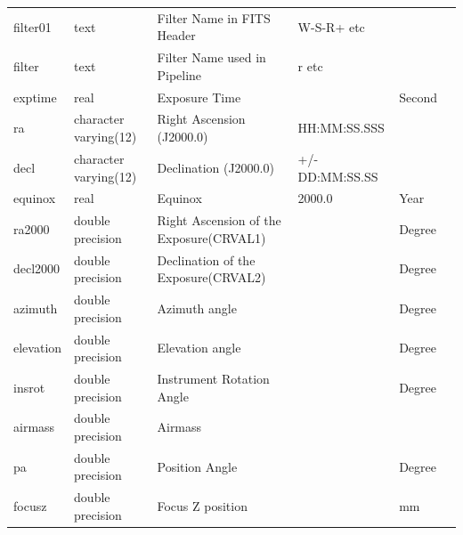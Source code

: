 \documentclass[12pt]{article}
\begin{document}
\begin{table}[thbp]
\begin{center}
{\begin{tabular}{llllll}
filter01 & text & Filter Name in FITS Header                               & W-S-R+ etc                &                  &             \\
filter & text & Filter Name used in Pipeline                             & r etc                     &                  &             \\
exptime & real & Exposure Time                                            &                           & Second           &             \\
ra & character varying(12) & Right Ascension (J2000.0)                                & HH:MM:SS.SSS              &                  &             \\
decl & character varying(12) & Declination (J2000.0)                                    & +/-DD:MM:SS.SS            &                  &             \\
equinox & real & Equinox                                                  & 2000.0                    & Year             &             \\
ra2000 & double precision & Right Ascension of the Exposure(CRVAL1)                  &                           & Degree           &             \\
decl2000 & double precision & Declination of the Exposure(CRVAL2)                      &                           & Degree           &             \\
azimuth & double precision & Azimuth angle                                            &                           & Degree           &             \\
elevation & double precision & Elevation angle                                          &                           & Degree           &             \\
insrot & double precision & Instrument Rotation Angle                                &                           & Degree           &             \\
airmass & double precision & Airmass                                                  &                           &                  &             \\
pa & double precision & Position Angle                                           &                           & Degree           &             \\
focusz & double precision & Focus Z position                                         &                           & mm               &             \\

\end{tabular}}
\end{center}
\end{table}
\end{document}

